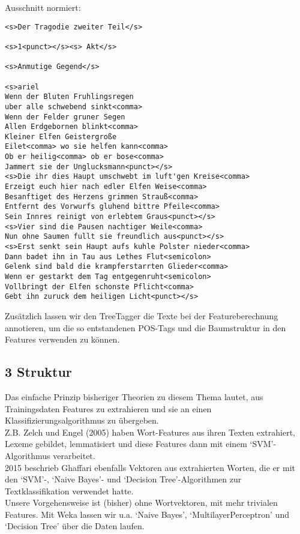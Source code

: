 \documentclass[]{article}
\begin{document}
Ausschnitt normiert:

\vspace{4 mm}\begin{verbatim}
<s>Der Tragodie zweiter Teil</s>

<s>1<punct></s><s> Akt</s>

<s>Anmutige Gegend</s>

<s>ariel
Wenn der Bluten Fruhlingsregen
uber alle schwebend sinkt<comma>
Wenn der Felder gruner Segen
Allen Erdgebornen blinkt<comma>
Kleiner Elfen Geistergroße
Eilet<comma> wo sie helfen kann<comma>
Ob er heilig<comma> ob er bose<comma>
Jammert sie der Unglucksmann<punct></s>
<s>Die ihr dies Haupt umschwebt im luft'gen Kreise<comma>
Erzeigt euch hier nach edler Elfen Weise<comma>
Besanftiget des Herzens grimmen Strauß<comma>
Entfernt des Vorwurfs gluhend bittre Pfeile<comma>
Sein Innres reinigt von erlebtem Graus<punct></s>
<s>Vier sind die Pausen nachtiger Weile<comma>
Nun ohne Saumen fullt sie freundlich aus<punct></s>
<s>Erst senkt sein Haupt aufs kuhle Polster nieder<comma>
Dann badet ihn in Tau aus Lethes Flut<semicolon>
Gelenk sind bald die krampferstarrten Glieder<comma>
Wenn er gestarkt dem Tag entgegenruht<semicolon>
Vollbringt der Elfen schonste Pflicht<comma>
Gebt ihn zuruck dem heiligen Licht<punct></s>
\end{verbatim}\vspace{4 mm}

Zusätzlich lassen wir den TreeTagger die Texte bei der Featureberechnung
annotieren, um die so entstandenen POS-Tags und die Baumstruktur in den
Features verwenden zu können.

\subsection{3 Struktur}\label{struktur}

Das einfache Prinzip bisheriger Theorien zu diesem Thema lautet, aus
Trainingsdaten Features zu extrahieren und sie an einen
Klassifizierungsalgorithmus zu übergeben.\\
Z.B. Zelch und Engel (2005) haben Wort-Features aus ihren Texten
extrahiert, Lexeme gebildet, lemmatisiert und diese Features dann mit
einem `SVM'-Algorithmus verarbeitet.\\
2015 beschrieb Ghaffari ebenfalls Vektoren aus extrahierten Worten, die
er mit den `SVM'-, `Naive Bayes'- und `Decision Tree'-Algorithmen zur
Textklassifikation verwendet hatte.\\
Unsere Vorgehensweise ist (bisher) ohne Wortvektoren, mit mehr trivialen
Features. Mit Weka lassen wir u.a. `Naive Bayes', `MultilayerPerceptron'
und `Decision Tree' über die Daten laufen.
\end{document}
